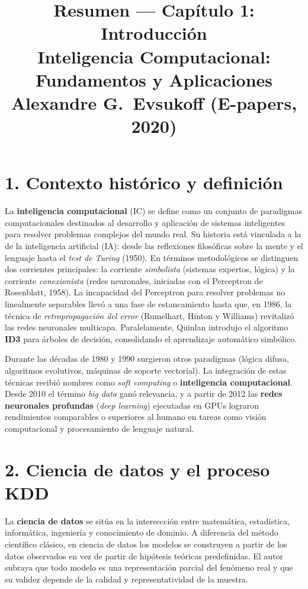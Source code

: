 \documentclass[11pt,a4paper]{article}
\title{\vspace{-1.5cm}Resumen --- Capítulo 1: Introducción\\
\large Inteligencia Computacional: Fundamentos y Aplicaciones \\
\normalsize Alexandre G.\ Evsukoff (E-papers, 2020)}
\author{}
\date{}
\begin{document}
\maketitle
\vspace{-1.2cm}

\section*{1. Contexto histórico y definición}

La \textbf{inteligencia computacional} (IC) se define como un conjunto de
paradigmas computacionales destinados al desarrollo y aplicación de sistemas
inteligentes para resolver problemas complejos del mundo real. Su historia está
vinculada a la de la inteligencia artificial (IA): desde las reflexiones filosóficas
sobre la mente y el lenguaje hasta el \emph{test de Turing} (1950). En términos
metodológicos se distinguen dos corrientes principales: la corriente
\emph{simbolista} (sistemas expertos, lógica) y la corriente
\emph{conexionista} (redes neuronales, iniciadas con el Perceptron de Rosenblatt,
1958). La incapacidad del Perceptron para resolver problemas no linealmente
separables llevó a una fase de estancamiento hasta que, en 1986, la técnica de
\emph{retropropagación del error} (Rumelhart, Hinton y Williams) revitalizó las
redes neuronales multicapa. Paralelamente, Quinlan introdujo el algoritmo \textbf{ID3}
para árboles de decisión, consolidando el aprendizaje automático simbólico.

Durante las décadas de 1980 y 1990 surgieron otros paradigmas (lógica difusa,
algoritmos evolutivos, máquinas de soporte vectorial). La integración de estas
técnicas recibió nombres como \emph{soft computing} o \textbf{inteligencia
computacional}. Desde 2010 el término \emph{big data} ganó relevancia, y a partir de
2012 las \textbf{redes neuronales profundas} (\emph{deep learning}) ejecutadas en GPUs
lograron rendimientos comparables o superiores al humano en tareas como visión
computacional y procesamiento de lenguaje natural.

\section*{2. Ciencia de datos y el proceso KDD}

La \textbf{ciencia de datos} se sitúa en la intersección entre matemática,
estadística, informática, ingeniería y conocimiento de dominio. A diferencia del
método científico clásico, en ciencia de datos los modelos se construyen a partir
de los datos observados en vez de partir de hipótesis teóricas predefinidas. El autor
subraya que todo modelo es una representación parcial del fenómeno real y que su
validez depende de la calidad y representatividad de la muestra.
\end{document}

